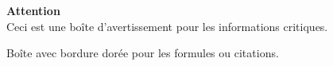\vspace{0.5cm}

\begin{warningbox}
    \textbf{\textcolor{red!70!black}{\large Attention}}\\[0.3cm]
    Ceci est une boîte d'avertissement pour les informations critiques.
\end{warningbox}

\vspace{0.5cm}

\begin{accentbox}
    \centering
    \vspace{0.3cm}
    {\large Boîte avec bordure dorée pour les formules ou citations.}
    \vspace{0.3cm}
\end{accentbox}
